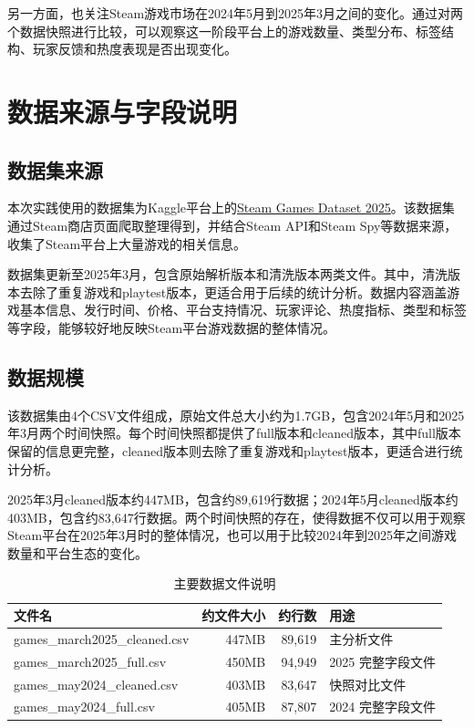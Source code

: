 \documentclass[UTF8,a4paper,12pt,fontset=fandol]{ctexart}
\begin{document}
另一方面，也关注Steam游戏市场在2024年5月到2025年3月之间的变化。通过对两个数据快照进行比较，可以观察这一阶段平台上的游戏数量、类型分布、标签结构、玩家反馈和热度表现是否出现变化。

\section{数据来源与字段说明}

\subsection{数据集来源}
本次实践使用的数据集为Kaggle平台上的\href{https://www.kaggle.com/datasets/artermiloff/steam-games-dataset/data}{Steam Games Dataset 2025}。该数据集通过Steam商店页面爬取整理得到，并结合Steam API和Steam Spy等数据来源，收集了Steam平台上大量游戏的相关信息。

数据集更新至2025年3月，包含原始解析版本和清洗版本两类文件。其中，清洗版本去除了重复游戏和playtest版本，更适合用于后续的统计分析。数据内容涵盖游戏基本信息、发行时间、价格、平台支持情况、玩家评论、热度指标、类型和标签等字段，能够较好地反映Steam平台游戏数据的整体情况。

\subsection{数据规模}
该数据集由4个CSV文件组成，原始文件总大小约为1.7GB，包含2024年5月和2025年3月两个时间快照。每个时间快照都提供了full版本和cleaned版本，其中full版本保留的信息更完整，cleaned版本则去除了重复游戏和playtest版本，更适合进行统计分析。

2025年3月cleaned版本约447MB，包含约89,619行数据；2024年5月cleaned版本约403MB，包含约83,647行数据。两个时间快照的存在，使得数据不仅可以用于观察Steam平台在2025年3月时的整体情况，也可以用于比较2024年到2025年之间游戏数量和平台生态的变化。

\begin{table}[H]
  \centering
  \caption{主要数据文件说明}
  \begin{tabularx}{0.95\textwidth}{lrrX}
    \toprule
    文件名 & 约文件大小 & 约行数 & 用途 \\
    \midrule
    games\_march2025\_cleaned.csv & 447MB & 89,619 & 主分析文件 \\
    games\_march2025\_full.csv & 450MB & 94,949 & 2025 完整字段文件 \\
    games\_may2024\_cleaned.csv & 403MB & 83,647 & 快照对比文件 \\
    games\_may2024\_full.csv & 405MB & 87,807 & 2024 完整字段文件 \\
    \bottomrule
  \end{tabularx}
\end{table}
\end{document}
